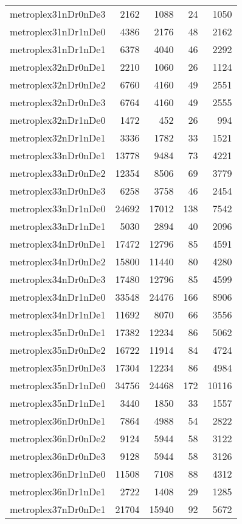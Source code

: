\begin{tabular}{lrrrr}
metroplex31nDr0nDe3 & 2162 & 1088 & 24 & 1050 \\
metroplex31nDr1nDe0 & 4386 & 2176 & 48 & 2162 \\
metroplex31nDr1nDe1 & 6378 & 4040 & 46 & 2292 \\
metroplex32nDr0nDe1 & 2210 & 1060 & 26 & 1124 \\
metroplex32nDr0nDe2 & 6760 & 4160 & 49 & 2551 \\
metroplex32nDr0nDe3 & 6764 & 4160 & 49 & 2555 \\
metroplex32nDr1nDe0 & 1472 & 452 & 26 & 994 \\
metroplex32nDr1nDe1 & 3336 & 1782 & 33 & 1521 \\
metroplex33nDr0nDe1 & 13778 & 9484 & 73 & 4221 \\
metroplex33nDr0nDe2 & 12354 & 8506 & 69 & 3779 \\
metroplex33nDr0nDe3 & 6258 & 3758 & 46 & 2454 \\
metroplex33nDr1nDe0 & 24692 & 17012 & 138 & 7542 \\
metroplex33nDr1nDe1 & 5030 & 2894 & 40 & 2096 \\
metroplex34nDr0nDe1 & 17472 & 12796 & 85 & 4591 \\
metroplex34nDr0nDe2 & 15800 & 11440 & 80 & 4280 \\
metroplex34nDr0nDe3 & 17480 & 12796 & 85 & 4599 \\
metroplex34nDr1nDe0 & 33548 & 24476 & 166 & 8906 \\
metroplex34nDr1nDe1 & 11692 & 8070 & 66 & 3556 \\
metroplex35nDr0nDe1 & 17382 & 12234 & 86 & 5062 \\
metroplex35nDr0nDe2 & 16722 & 11914 & 84 & 4724 \\
metroplex35nDr0nDe3 & 17304 & 12234 & 86 & 4984 \\
metroplex35nDr1nDe0 & 34756 & 24468 & 172 & 10116 \\
metroplex35nDr1nDe1 & 3440 & 1850 & 33 & 1557 \\
metroplex36nDr0nDe1 & 7864 & 4988 & 54 & 2822 \\
metroplex36nDr0nDe2 & 9124 & 5944 & 58 & 3122 \\
metroplex36nDr0nDe3 & 9128 & 5944 & 58 & 3126 \\
metroplex36nDr1nDe0 & 11508 & 7108 & 88 & 4312 \\
metroplex36nDr1nDe1 & 2722 & 1408 & 29 & 1285 \\
metroplex37nDr0nDe1 & 21704 & 15940 & 92 & 5672 \\

\end{tabular}
